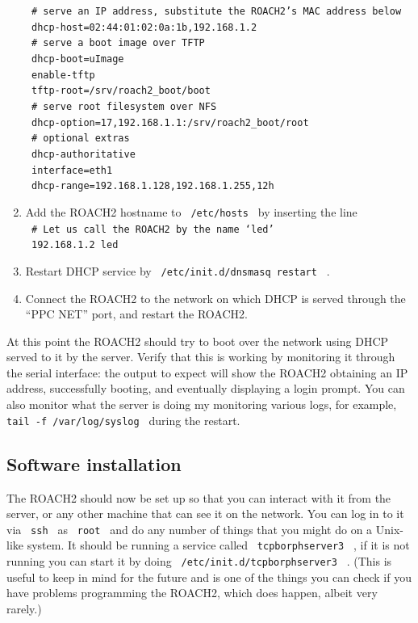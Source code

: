 \documentclass[a4paper,10pt]{article}
\newcommand{\ilcode}[1]{\begingroup
	\setlength{\fboxsep}{1pt}\colorbox{ilcodebg}{\small\tt%
		#1%
	}\endgroup}
\begin{document}
\begin{enumerate}
	\ilcode{\# serve an IP address, substitute the ROACH2's MAC address below}\\
	\ilcode{dhcp-host=02:44:01:02:0a:1b,192.168.1.2}\\
	\ilcode{\# serve a boot image over TFTP}\\
	\ilcode{dhcp-boot=uImage}\\
	\ilcode{enable-tftp}\\
	\ilcode{tftp-root=/srv/roach2\_boot/boot}\\
	\ilcode{\# serve root filesystem over NFS}\\
	\ilcode{dhcp-option=17,192.168.1.1:/srv/roach2\_boot/root}\\
	\ilcode{\# optional extras}\\
	\ilcode{dhcp-authoritative}\\
	\ilcode{interface=eth1}\\
	\ilcode{dhcp-range=192.168.1.128,192.168.1.255,12h}
	\item Add the ROACH2 hostname to \ilcode{/etc/hosts} by inserting 
	the line\\
	\ilcode{\# Let us call the ROACH2 by the name `led'}\\
	\ilcode{192.168.1.2 led}
	\item Restart DHCP service by \ilcode{/etc/init.d/dnsmasq restart} .
	\item Connect the ROACH2 to the network on which DHCP is served 
	through the ``PPC NET'' port, and restart the ROACH2.
\end{enumerate}

\noindent At this point the ROACH2 should try to boot over the network using DHCP 
served to it by the server. Verify that this is working by monitoring 
it through the serial interface: the output to expect will show the 
ROACH2 obtaining an IP address, successfully booting, and eventually 
displaying a login prompt. You can also monitor what the server is 
doing my monitoring various logs, for example, 
\ilcode{tail -f /var/log/syslog} during the restart.

\subsection{Software installation}
\label{sec:swinstall}
The ROACH2 should now be set up so that you can interact with it from 
the server, or any other machine that can see it on the network. You can 
log in to it via \ilcode{ssh} as \ilcode{root} and do any number of 
things that you might do on a Unix-like system. It should be running a 
service called \ilcode{tcpborphserver3} , if it is not running you can 
start it by doing \ilcode{/etc/init.d/tcpborphserver3} . (This is useful
to keep in mind for the future and is one of the things you can check 
if you have problems programming the ROACH2, which does happen, albeit 
very rarely.)
\end{document}
